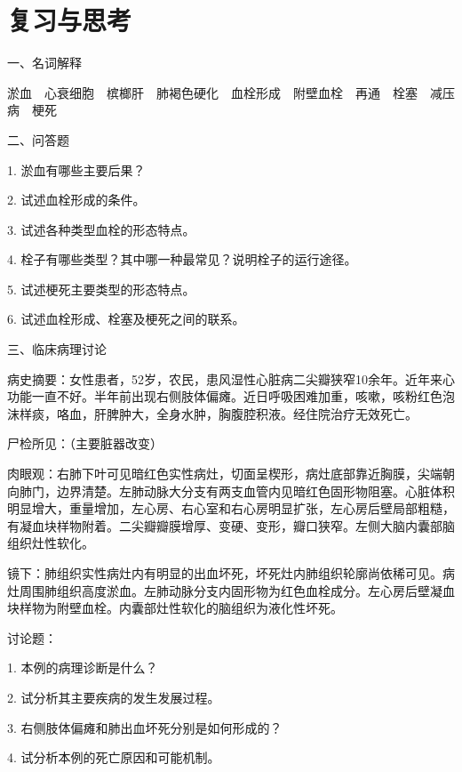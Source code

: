 \section*{复习与思考}

{一、名词解释}

淤血　心衰细胞　槟榔肝　肺褐色硬化　血栓形成　附壁血栓　再通　栓塞　减压病　梗死

{二、问答题}

1. 淤血有哪些主要后果？

2. 试述血栓形成的条件。

3. 试述各种类型血栓的形态特点。

4. 栓子有哪些类型？其中哪一种最常见？说明栓子的运行途径。

5. 试述梗死主要类型的形态特点。

6. 试述血栓形成、栓塞及梗死之间的联系。

{三、临床病理讨论}

病史摘要：女性患者，52岁，农民，患风湿性心脏病二尖瓣狭窄10余年。近年来心功能一直不好。半年前出现右侧肢体偏瘫。近日呼吸困难加重，咳嗽，咳粉红色泡沫样痰，咯血，肝脾肿大，全身水肿，胸腹腔积液。经住院治疗无效死亡。

尸检所见：（主要脏器改变）

肉眼观：右肺下叶可见暗红色实性病灶，切面呈楔形，病灶底部靠近胸膜，尖端朝向肺门，边界清楚。左肺动脉大分支有两支血管内见暗红色固形物阻塞。心脏体积明显增大，重量增加，左心房、右心室和右心房明显扩张，左心房后壁局部粗糙，有凝血块样物附着。二尖瓣瓣膜增厚、变硬、变形，瓣口狭窄。左侧大脑内囊部脑组织灶性软化。

镜下：肺组织实性病灶内有明显的出血坏死，坏死灶内肺组织轮廓尚依稀可见。病灶周围肺组织高度淤血。左肺动脉分支内固形物为红色血栓成分。左心房后壁凝血块样物为附壁血栓。内囊部灶性软化的脑组织为液化性坏死。

讨论题：

1. 本例的病理诊断是什么？

2. 试分析其主要疾病的发生发展过程。

3. 右侧肢体偏瘫和肺出血坏死分别是如何形成的？

4. 试分析本例的死亡原因和可能机制。


